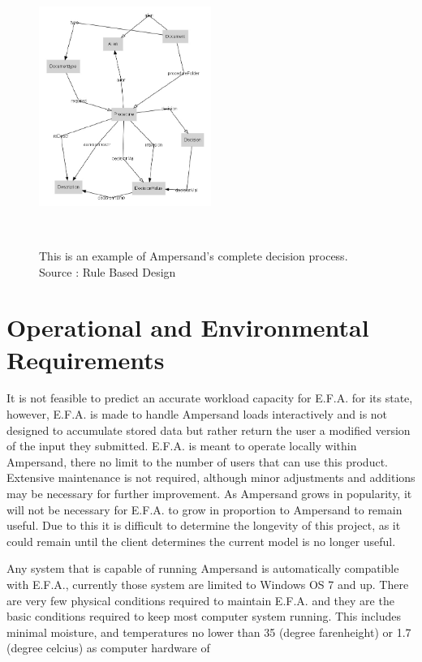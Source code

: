 \documentclass[12pt]{report}
\begin{document}
\begin{figure}
	\centering
	\includegraphics[width=0.5\textwidth]{../figures/Ampersanddecision}
	\caption{This is an example of Ampersand's complete decision process. Source : Rule Based 
	Design}~\label{fig:figure5}
\end{figure}
\section{Operational and Environmental Requirements}\label{sec:Operational}
It is not feasible to predict an accurate workload capacity for E.F.A. for its state, however, 
E.F.A. is made to handle Ampersand loads interactively and is not designed to accumulate stored 
data but rather return the user a modified version of the input they submitted. E.F.A. is meant to 
operate locally within Ampersand, there no limit to the number of users that can use this product. 
Extensive maintenance is not required, although minor adjustments and additions may be necessary 
for further improvement. As Ampersand grows in popularity, it will not be necessary for E.F.A. to 
grow in proportion to Ampersand to remain useful. Due to this it is difficult to determine the 
longevity of this project, as it could remain until the client determines the current model is no 
longer useful. 

Any system that is capable of running Ampersand is automatically compatible with E.F.A., currently 
those system are limited to Windows OS 7 and up. There are very few physical conditions required to 
maintain E.F.A. and they are the basic conditions required to keep most computer system running. 
This includes minimal moisture, and temperatures no lower than 35 (degree farenheight) or 1.7 
(degree celcius) %
as computer hardware of 
\end{document}
